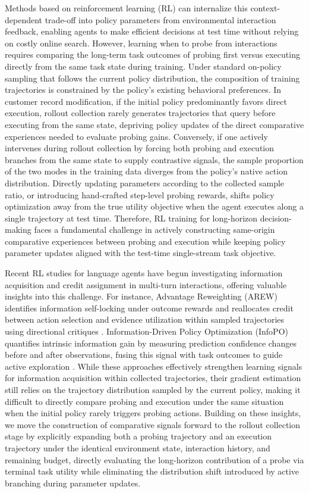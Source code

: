 \documentclass[11pt]{article}
\theoremstyle{definition}
\theoremstyle{remark}
\begin{document}
Methods based on reinforcement learning (RL) can internalize this context-dependent trade-off into policy parameters from environmental interaction feedback, enabling agents to make efficient decisions at test time without relying on costly online search.
However, learning when to probe from interactions requires comparing the long-term task outcomes of probing first versus executing directly from the same task state during training.
Under standard on-policy sampling that follows the current policy distribution, the composition of training trajectories is constrained by the policy's existing behavioral preferences.
In customer record modification, if the initial policy predominantly favors direct execution, rollout collection rarely generates trajectories that query before executing from the same state, depriving policy updates of the direct comparative experiences needed to evaluate probing gains.
Conversely, if one actively intervenes during rollout collection by forcing both probing and execution branches from the same state to supply contrastive signals, the sample proportion of the two modes in the training data diverges from the policy's native action distribution.
Directly updating parameters according to the collected sample ratio, or introducing hand-crafted step-level probing rewards, shifts policy optimization away from the true utility objective when the agent executes along a single trajectory at test time.
Therefore, RL training for long-horizon decision-making faces a fundamental challenge in actively constructing same-origin comparative experiences between probing and execution while keeping policy parameter updates aligned with the test-time single-stream task objective.

Recent RL studies for language agents have begun investigating information acquisition and credit assignment in multi-turn interactions, offering valuable insights into this challenge.
For instance, Advantage Reweighting (AREW) identifies information self-locking under outcome rewards and reallocates credit between action selection and evidence utilization within sampled trajectories using directional critiques \citep{arew2026}.
Information-Driven Policy Optimization (InfoPO) quantifies intrinsic information gain by measuring prediction confidence changes before and after observations, fusing this signal with task outcomes to guide active exploration \citep{infopo2026}.
While these approaches effectively strengthen learning signals for information acquisition within collected trajectories, their gradient estimation still relies on the trajectory distribution sampled by the current policy, making it difficult to directly compare probing and execution under the same situation when the initial policy rarely triggers probing actions.
Building on these insights, we move the construction of comparative signals forward to the rollout collection stage by explicitly expanding both a probing trajectory and an execution trajectory under the identical environment state, interaction history, and remaining budget, directly evaluating the long-horizon contribution of a probe via terminal task utility while eliminating the distribution shift introduced by active branching during parameter updates.
\end{document}
